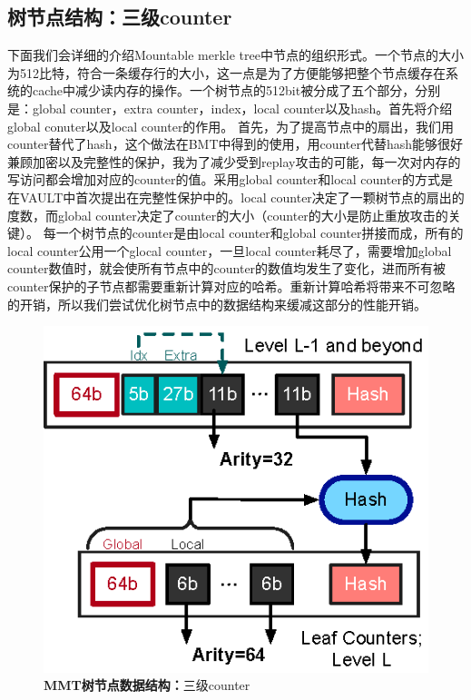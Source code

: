 \subsection{树节点结构：三级counter}
下面我们会详细的介绍Mountable merkle tree中节点的组织形式。一个节点的大小为512比特，符合一条缓存行的大小，这一点是为了方便能够把整个节点缓存在系统的cache中减少读内存的操作。一个树节点的512bit被分成了五个部分，分别是：global counter，extra counter，index，local counter以及hash。首先将介绍global conuter以及local counter的作用。
首先，为了提高节点中的扇出，我们用counter替代了hash，这个做法在BMT中得到的使用，用counter代替hash能够很好兼顾加密以及完整性的保护，我为了减少受到replay攻击的可能，每一次对内存的写访问都会增加对应的counter的值。采用global counter和local counter的方式是在VAULT中首次提出在完整性保护中的。local counter决定了一颗树节点的扇出的度数，而global counter决定了counter的大小（counter的大小是防止重放攻击的关键）。
每一个树节点的counter是由local counter和global counter拼接而成，所有的local counter公用一个glocal counter，一旦local counter耗尽了，需要增加global counter数值时，就会使所有节点中的counter的数值均发生了变化，进而所有被counter保护的子节点都需要重新计算对应的哈希。重新计算哈希将带来不可忽略的开销，所以我们尝试优化树节点中的数据结构来缓减这部分的性能开销。

\begin{figure}[!htp]
  \centering
  \includegraphics[scale=1]{fig/design-hw-mountable-tree-layout.eps}
  \caption{\textbf{MMT树节点数据结构：}三级counter}
 \label{fig:three-level-count.png}
\end{figure}

